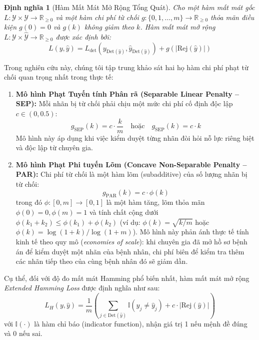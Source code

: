 \documentclass[11pt,a4paper]{article}
\newtheorem{definition}{Định nghĩa}[section]
\begin{document}
\begin{definition}[Hàm Mất Mát Mở Rộng Tổng Quát]
Cho một hàm mất mát gốc $L: \mathcal{Y} \times \mathcal{Y} \to \mathbb{R}_{\ge 0}$ và một hàm chi phí từ chối $g: \{0, 1, \dots, m\} \to \mathbb{R}_{\ge 0}$ thỏa mãn điều kiện $g(0) = 0$ và $g(k)$ không giảm theo $k$. Hàm mất mát mở rộng $L: \mathcal{Y} \times \hat{\mathcal{Y}} \to \mathbb{R}_{\ge 0}$ được xác định bởi:
\begin{equation}
L(y, \hat{y}) = L_{\mathrm{det}}(y_{\mathrm{Det}(\hat{y})}, \hat{y}_{\mathrm{Det}(\hat{y})}) + g(|\mathrm{Rej}(\hat{y})|)
\label{eq:extended_loss_general}
\end{equation}
\end{definition}

Trong nghiên cứu này, chúng tôi tập trung khảo sát hai họ hàm chi phí phạt từ chối quan trọng nhất trong thực tế:
\begin{enumerate}
    \item \textbf{Mô hình Phạt Tuyến tính Phân rã (Separable Linear Penalty -- SEP):} 
    Mỗi nhãn bị từ chối phải chịu một mức chi phí cố định độc lập $c \in (0, 0.5)$:
    \begin{equation}
    g_{\mathrm{SEP}}(k) = c \cdot \frac{k}{m} \quad \text{hoặc} \quad g_{\mathrm{SEP}}(k) = c \cdot k
    \label{eq:penalty_linear}
    \end{equation}
    Mô hình này áp dụng khi việc kiểm duyệt từng nhãn đòi hỏi nỗ lực riêng biệt và độc lập từ chuyên gia.
    
    \item \textbf{Mô hình Phạt Phi tuyến Lõm (Concave Non-Separable Penalty -- PAR):}
    Chi phí từ chối là một hàm lõm (subadditive) của số lượng nhãn bị từ chối:
    \begin{equation}
    g_{\mathrm{PAR}}(k) = c \cdot \phi(k)
    \label{eq:penalty_concave}
    \end{equation}
    trong đó $\phi: [0, m] \to [0, 1]$ là một hàm tăng, lõm thỏa mãn $\phi(0) = 0, \phi(m) = 1$ và tính chất cộng dưới $\phi(k_1 + k_2) \le \phi(k_1) + \phi(k_2)$ (ví dụ: $\phi(k) = \sqrt{k/m}$ hoặc $\phi(k) = \log(1 + k)/\log(1 + m)$). Mô hình này phản ánh thực tế tính kinh tế theo quy mô (\textit{economies of scale}): khi chuyên gia đã mở hồ sơ bệnh án để kiểm duyệt một nhãn của bệnh nhân, chi phí biên để kiểm tra thêm các nhãn tiếp theo của cùng bệnh nhân đó sẽ giảm dần.
\end{enumerate}

Cụ thể, đối với độ đo mất mát Hamming phổ biến nhất, hàm mất mát mở rộng \textit{Extended Hamming Loss} được định nghĩa như sau:
\begin{equation}
L_H(y, \hat{y}) = \frac{1}{m} \left( \sum_{j \in \mathrm{Det}(\hat{y})} \mathbb{I}(y_j \neq \hat{y}_j) + c \cdot |\mathrm{Rej}(\hat{y})| \right)
\label{eq:extended_hamming_loss}
\end{equation}
với $\mathbb{I}(\cdot)$ là hàm chỉ báo (indicator function), nhận giá trị 1 nếu mệnh đề đúng và 0 nếu sai.
\end{document}
